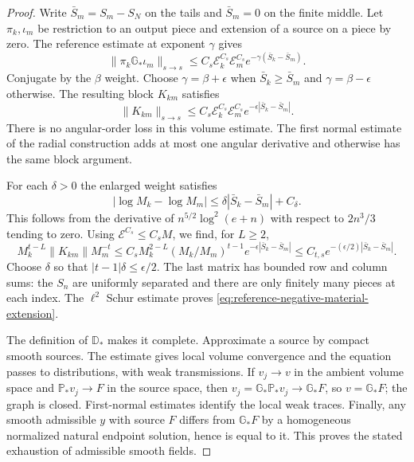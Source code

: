 \begin{proof}
Write $\bar S_m=S_m-S_N$ on the tails and $\bar S_m=0$ on the
finite middle. Let $\pi_k,\iota_m$ be restriction to an output piece
and extension of a source on a piece by zero. The reference estimate
at exponent $\gamma$ gives
\[
 \|\pi_k\mathbb G_*\iota_m\|_{s\to s}
 \le C_s\mathcal E_k^{C_s}\mathcal E_m^{C_s}
                        e^{-\gamma(\bar S_k-\bar S_m)}.
\]
Conjugate by the $\beta$ weight. Choose $\gamma=\beta+\epsilon$
when $\bar S_k\ge\bar S_m$ and $\gamma=\beta-\epsilon$ otherwise.
The resulting block $K_{km}$ satisfies
\begin{equation}\label{eq:global-two-weight-block-bound}
 \|K_{km}\|_{s\to s}
 \le C_s\mathcal E_k^{C_s}\mathcal E_m^{C_s}
                    e^{-\epsilon|\bar S_k-\bar S_m|}.
\end{equation}
There is no angular-order loss in this volume estimate. The first
normal estimate of the radial construction adds at most one angular
derivative and otherwise has the same block argument.

For each $\delta>0$ the enlarged weight satisfies
\[
 |\log M_k-\log M_m|
 \le\delta|\bar S_k-\bar S_m|+C_\delta.
\]
This follows from the derivative of
$n^{5/2}\log^2(e+n)$ with respect to $2n^3/3$ tending to zero.
Using $\mathcal E^{C_s}\le C_sM$, we find, for $L\ge2$,
\[
 M_k^{t-L}\|K_{km}\|M_m^{-t}
 \le C_sM_k^{2-L}(M_k/M_m)^{t-1}
                         e^{-\epsilon|\bar S_k-\bar S_m|}
 \le C_{t,s}e^{-(\epsilon/2)|\bar S_k-\bar S_m|}.
\]
Choose $\delta$ so that $|t-1|\delta\le\epsilon/2$.
The last matrix has bounded row and column sums: the $S_n$ are
uniformly separated and there are only finitely many pieces at each
index. The $\ell^2$ Schur estimate proves
\eqref{eq:reference-negative-material-extension}.

The definition of $\mathbb D_*$ makes it complete. Approximate a
source by compact smooth sources. The estimate gives local volume
convergence and the equation passes to distributions, with weak
transmissions. If $v_j\to v$ in the ambient volume space and
$\mathbb P_*v_j\to F$ in the source space, then
$v_j=\mathbb G_*\mathbb P_*v_j\to\mathbb G_*F$, so
$v=\mathbb G_*F$; the graph is closed. First-normal estimates identify
the local weak traces. Finally, any smooth admissible $y$ with source
$F$ differs from $\mathbb G_*F$ by a homogeneous normalized natural
endpoint solution, hence is equal to it. This proves the stated
exhaustion of admissible smooth fields.
\end{proof}

